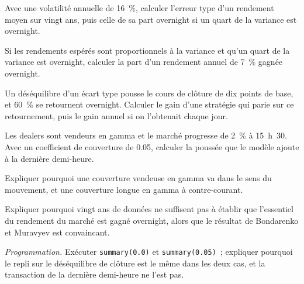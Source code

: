 \begin{exercise}[$\star$]\label{exo:s1:intraday-patterns:1}
Avec une volatilité annuelle de 16~\%, calculer l'erreur type d'un rendement moyen sur vingt ans, puis celle de sa part overnight si un quart de la variance est overnight.
\end{exercise}

\begin{exercise}[$\star$]\label{exo:s1:intraday-patterns:2}
Si les rendements espérés sont proportionnels à la variance et qu'un quart de la variance est overnight, calculer la part d'un rendement annuel de 7~\% gagnée overnight.
\end{exercise}

\begin{exercise}[$\star$]\label{exo:s1:intraday-patterns:3}
Un déséquilibre d'un écart type pousse le cours de clôture de dix points de base, et 60~\% se retournent overnight. Calculer le gain d'une stratégie qui parie sur ce retournement, puis le gain annuel si on
l'obtenait chaque jour.
\end{exercise}

\begin{exercise}[$\star\star$]\label{exo:s1:intraday-patterns:4}
Les dealers sont vendeurs en gamma et le marché progresse de 2~\% à 15~h~30. Avec un coefficient de couverture de 0.05, calculer la poussée que le modèle ajoute à la dernière demi-heure.
\end{exercise}

\begin{exercise}[$\star\star$]\label{exo:s1:intraday-patterns:5}
Expliquer pourquoi une couverture vendeuse en gamma va dans le sens du mouvement, et une couverture longue en gamma à contre-courant.
\end{exercise}

\begin{exercise}[$\star\star$]\label{exo:s1:intraday-patterns:6}
Expliquer pourquoi vingt ans de données ne suffisent pas à établir que l'essentiel du rendement du marché est gagné overnight, alors que le résultat de Bondarenko et Muravyev est convaincant.
\end{exercise}

\begin{exercise}[$\star\star\star$]\label{exo:s1:intraday-patterns:7}
\emph{Programmation.} Exécuter \texttt{summary(0.0)} et \texttt{summary(0.05)}~; expliquer pourquoi le repli sur le déséquilibre de clôture est le même dans les deux cas, et la transaction de la dernière demi-heure
ne l'est pas.
\end{exercise}

